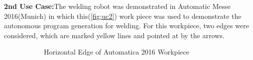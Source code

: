 \textbf{2nd Use Case:}The welding robot was demonstrated in Automatic Messe 2016(Munich) in which this(\ref{fig:uc2}) work piece was used to demonstrate the autonomous program generation for welding. For this workpiece, two edges were considered, which are marked yellow lines and pointed at by the arrows.
\begin{figure}[!htbp] %
	\centering
	\begin{subfigure}[b]{0.4\textwidth}
		\caption{Horizontal Edge of Automatica 2016 Workpiece}  
		\label{fig:imguc3}
	\end{subfigure}
	\begin{subfigure}[b]{0.4\textwidth}

\end{subfigure}
\end{figure}
